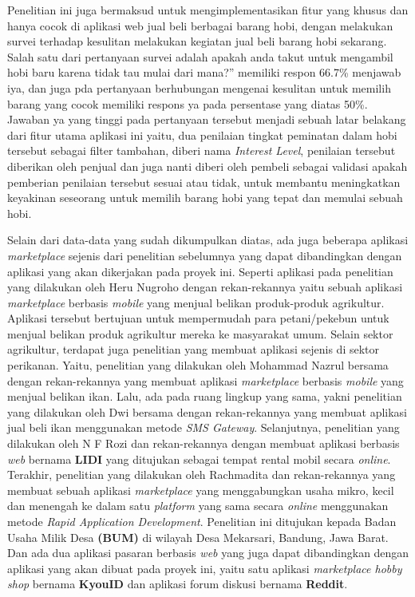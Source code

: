 \documentclass[a4paper]{article}
\begin{document}
Penelitian ini juga bermaksud untuk mengimplementasikan fitur yang khusus dan hanya cocok di aplikasi web jual beli berbagai barang hobi, dengan melakukan survei terhadap kesulitan melakukan kegiatan jual beli barang hobi sekarang. Salah satu dari pertanyaan survei adalah apakah anda takut untuk mengambil hobi baru karena tidak tau mulai dari mana?” memiliki respon 66.7\% menjawab iya, dan juga pda pertanyaan berhubungan mengenai kesulitan untuk memilih barang yang cocok memiliki respons ya pada persentase yang diatas 50\%. Jawaban ya yang tinggi pada pertanyaan tersebut menjadi sebuah latar belakang dari fitur utama aplikasi ini yaitu, dua penilaian tingkat peminatan dalam hobi tersebut sebagai filter tambahan, diberi nama \textit{Interest Level}, penilaian tersebut diberikan oleh penjual dan juga nanti diberi oleh pembeli sebagai validasi apakah pemberian penilaian tersebut sesuai atau tidak, untuk membantu meningkatkan keyakinan seseorang untuk memilih barang hobi yang tepat dan memulai sebuah hobi.

Selain dari data-data yang sudah dikumpulkan diatas, ada juga beberapa aplikasi \textit{marketplace} sejenis dari penelitian sebelumnya yang dapat dibandingkan dengan aplikasi yang akan dikerjakan pada proyek ini. Seperti aplikasi pada penelitian yang dilakukan oleh Heru Nugroho dengan rekan-rekannya yaitu sebuah aplikasi \textit{marketplace} berbasis \textit{mobile} yang menjual belikan produk-produk agrikultur. Aplikasi tersebut bertujuan untuk mempermudah para petani/pekebun untuk menjual belikan produk agrikultur mereka ke masyarakat umum\autocite{agriculture-marketplace}. Selain sektor agrikultur, terdapat juga penelitian yang membuat aplikasi sejenis di sektor perikanan. Yaitu, penelitian yang dilakukan oleh Mohammad Nazrul bersama dengan rekan-rekannya yang membuat aplikasi \textit{marketplace} berbasis \textit{mobile} yang menjual belikan ikan\autocite{fishes-marketplace}. Lalu, ada pada ruang lingkup yang sama, yakni penelitian yang dilakukan oleh Dwi bersama dengan rekan-rekannya yang membuat aplikasi jual beli ikan menggunakan metode \textit{SMS Gateway}\autocite{c2c-fish-marketplace}. Selanjutnya, penelitian yang dilakukan oleh N F Rozi dan rekan-rekannya dengan membuat aplikasi berbasis \textit{web} bernama \textbf{LIDI} yang ditujukan sebagai tempat rental mobil secara \textit{online}\autocite{lidi-car-rental}. Terakhir, penelitian yang dilakukan oleh Rachmadita dan rekan-rekannya yang membuat sebuah aplikasi \textit{marketplace} yang menggabungkan usaha mikro, kecil dan menengah ke dalam satu \textit{platform} yang sama secara \textit{online} menggunakan metode \textit{Rapid Application Development}. Penelitian ini ditujukan kepada Badan Usaha Milik Desa \textbf{(BUM)} di wilayah Desa Mekarsari, Bandung, Jawa Barat\autocite{bum-mekarsari}. Dan ada dua aplikasi pasaran berbasis \textit{web} yang juga dapat dibandingkan dengan aplikasi yang akan dibuat pada proyek ini, yaitu satu aplikasi \textit{marketplace hobby shop} bernama \textbf{KyouID} dan aplikasi forum diskusi bernama \textbf{Reddit}.
\end{document}
